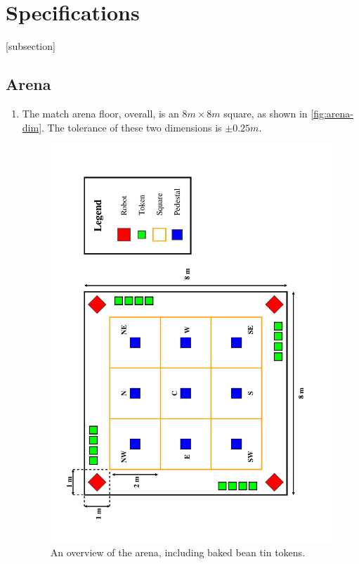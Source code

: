 \section{Specifications}
\label{sec:Specifications}

[subsection]
\newcommand{\rcnii}{\stepcounter{rulei}\arabic{section}.\arabic{subsection}.\arabic{rulei}}
\renewcommand{\labelenumi}{\rcnii}

\subsection{Arena}
\label{sub:arena}
\begin{enumerate}
\item The match arena floor, overall, is an $8m \times 8m$ square, as shown in \autoref{fig:arena-dim}.
 The tolerance of these two dimensions is $\pm0.25m$.

\begin{figure}
  \includegraphics[keepaspectratio, clip, width=\textwidth]{./images/arena.pdf}
  \caption{\label{fig:arena-dim}An overview of the arena, including baked bean tin tokens.}
\end{figure}


\end{enumerate}

